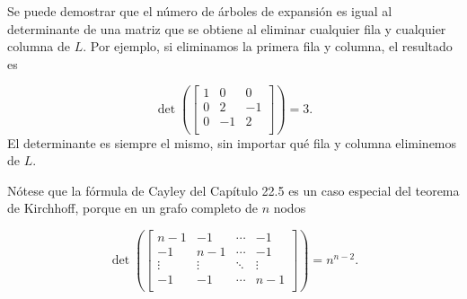 Se puede demostrar que
el número de árboles de expansión es igual
al determinante de una matriz que se obtiene
al eliminar cualquier fila y cualquier columna de $L$.
Por ejemplo, si eliminamos la primera fila
y columna, el resultado es

\[ \det(
\begin{bmatrix}
  1 & 0 & 0 \\
  0 & 2 & -1 \\
  0 & -1 & 2 \\
 \end{bmatrix}
) =3.\]
El determinante es siempre el mismo,
sin importar qué fila y columna eliminemos de $L$.

Nótese que la fórmula de Cayley del Capítulo 22.5 es
un caso especial del teorema de Kirchhoff,
porque en un grafo completo de $n$ nodos

\[ \det(
\begin{bmatrix}
  n-1 & -1 & \cdots & -1 \\
  -1 & n-1 & \cdots & -1 \\
  \vdots & \vdots & \ddots & \vdots \\
  -1 & -1 & \cdots & n-1 \\
 \end{bmatrix}
) =n^{n-2}.\]


